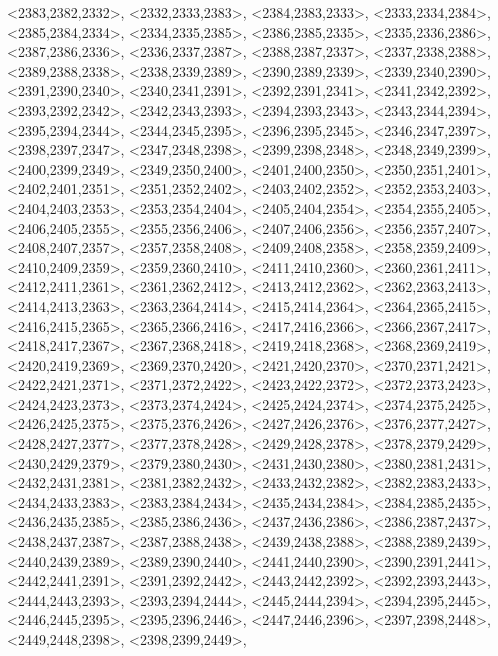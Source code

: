 \documentclass[a4paper,10pt]{article}
\begin{document}
\begin{eulernotebook}
\begin{euleroutput}
  <2383,2382,2332>,
  <2332,2333,2383>,
  <2384,2383,2333>,
  <2333,2334,2384>,
  <2385,2384,2334>,
  <2334,2335,2385>,
  <2386,2385,2335>,
  <2335,2336,2386>,
  <2387,2386,2336>,
  <2336,2337,2387>,
  <2388,2387,2337>,
  <2337,2338,2388>,
  <2389,2388,2338>,
  <2338,2339,2389>,
  <2390,2389,2339>,
  <2339,2340,2390>,
  <2391,2390,2340>,
  <2340,2341,2391>,
  <2392,2391,2341>,
  <2341,2342,2392>,
  <2393,2392,2342>,
  <2342,2343,2393>,
  <2394,2393,2343>,
  <2343,2344,2394>,
  <2395,2394,2344>,
  <2344,2345,2395>,
  <2396,2395,2345>,
  <2346,2347,2397>,
  <2398,2397,2347>,
  <2347,2348,2398>,
  <2399,2398,2348>,
  <2348,2349,2399>,
  <2400,2399,2349>,
  <2349,2350,2400>,
  <2401,2400,2350>,
  <2350,2351,2401>,
  <2402,2401,2351>,
  <2351,2352,2402>,
  <2403,2402,2352>,
  <2352,2353,2403>,
  <2404,2403,2353>,
  <2353,2354,2404>,
  <2405,2404,2354>,
  <2354,2355,2405>,
  <2406,2405,2355>,
  <2355,2356,2406>,
  <2407,2406,2356>,
  <2356,2357,2407>,
  <2408,2407,2357>,
  <2357,2358,2408>,
  <2409,2408,2358>,
  <2358,2359,2409>,
  <2410,2409,2359>,
  <2359,2360,2410>,
  <2411,2410,2360>,
  <2360,2361,2411>,
  <2412,2411,2361>,
  <2361,2362,2412>,
  <2413,2412,2362>,
  <2362,2363,2413>,
  <2414,2413,2363>,
  <2363,2364,2414>,
  <2415,2414,2364>,
  <2364,2365,2415>,
  <2416,2415,2365>,
  <2365,2366,2416>,
  <2417,2416,2366>,
  <2366,2367,2417>,
  <2418,2417,2367>,
  <2367,2368,2418>,
  <2419,2418,2368>,
  <2368,2369,2419>,
  <2420,2419,2369>,
  <2369,2370,2420>,
  <2421,2420,2370>,
  <2370,2371,2421>,
  <2422,2421,2371>,
  <2371,2372,2422>,
  <2423,2422,2372>,
  <2372,2373,2423>,
  <2424,2423,2373>,
  <2373,2374,2424>,
  <2425,2424,2374>,
  <2374,2375,2425>,
  <2426,2425,2375>,
  <2375,2376,2426>,
  <2427,2426,2376>,
  <2376,2377,2427>,
  <2428,2427,2377>,
  <2377,2378,2428>,
  <2429,2428,2378>,
  <2378,2379,2429>,
  <2430,2429,2379>,
  <2379,2380,2430>,
  <2431,2430,2380>,
  <2380,2381,2431>,
  <2432,2431,2381>,
  <2381,2382,2432>,
  <2433,2432,2382>,
  <2382,2383,2433>,
  <2434,2433,2383>,
  <2383,2384,2434>,
  <2435,2434,2384>,
  <2384,2385,2435>,
  <2436,2435,2385>,
  <2385,2386,2436>,
  <2437,2436,2386>,
  <2386,2387,2437>,
  <2438,2437,2387>,
  <2387,2388,2438>,
  <2439,2438,2388>,
  <2388,2389,2439>,
  <2440,2439,2389>,
  <2389,2390,2440>,
  <2441,2440,2390>,
  <2390,2391,2441>,
  <2442,2441,2391>,
  <2391,2392,2442>,
  <2443,2442,2392>,
  <2392,2393,2443>,
  <2444,2443,2393>,
  <2393,2394,2444>,
  <2445,2444,2394>,
  <2394,2395,2445>,
  <2446,2445,2395>,
  <2395,2396,2446>,
  <2447,2446,2396>,
  <2397,2398,2448>,
  <2449,2448,2398>,
  <2398,2399,2449>,

\end{euleroutput}
\end{eulernotebook}
\end{document}
